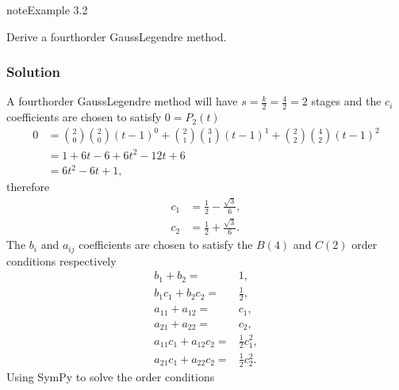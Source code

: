 \documentclass[letterpaper,10pt,english]{jupyterBook}
\begin{document}
\begin{sphinxadmonition}{note}{Example 3.2}

\sphinxAtStartPar
Derive a fourth\sphinxhyphen{}order Gauss\sphinxhyphen{}Legendre method.
\subsubsection*{Solution}

\sphinxAtStartPar
A fourth\sphinxhyphen{}order Gauss\sphinxhyphen{}Legendre method will have \(s = \frac{k}{2} = \frac{4}{2} = 2\) stages and the \(c_i\) coefficients are chosen to satisfy \(0=P_2(t)\)
\begin{align*}
    0&=\binom{2}{0}\binom{2}{0}(t-1)^0 +\binom{2}{1}\binom{3}{1}(t-1)^1 +\binom{2}{2}\binom{4}{2}(t-1)^2 \\
    &=1 + 6t - 6 + 6t^2 - 12t + 6\\
    &=6t^2 - 6t+1,
\end{align*}
\sphinxAtStartPar
therefore
\begin{align*} 
    c_1 &= \frac{1}{2} - \frac{\sqrt{3}}{6}, \\
    c_2 &= \frac{1}{2} + \frac{\sqrt{3}}{6}.
\end{align*}
\sphinxAtStartPar
The \(b_i\) and \(a_{ij}\) coefficients are chosen to satisfy the \(B(4)\) and \(C(2)\) order conditions respectively
\begin{align*}
    b_1 + b_2 = & 1,\\
    b_1 c_1 + b_2 c_2 = & \frac{1}{2},\\
    a_{11} + a_{12} = & c_1 ,\\
    a_{21} + a_{22} = & c_2 ,\\
    a_{11} c_1 + a_{12} c_2 = & \frac{1}{2}c_1^2 ,\\
    a_{21} c_1 + a_{22} c_2 = & \frac{1}{2}c_2^2 .
\end{align*}
\sphinxAtStartPar
Using SymPy to solve the order conditions

\begin{sphinxVerbatim}[commandchars=\\\{\}]
   

          \PYGZbs{}


\end{sphinxVerbatim}
\end{sphinxadmonition}
\end{document}
